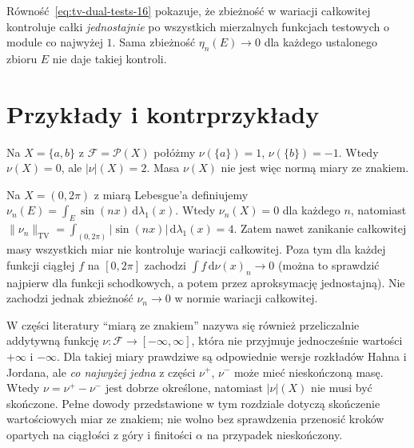 \begin{uwaga}
Równość~\eqref{eq:tv-dual-tests-16} pokazuje, że zbieżność
w wariacji całkowitej kontroluje całki \emph{jednostajnie}
po wszystkich mierzalnych funkcjach testowych o module
co najwyżej $1$. Sama zbieżność $\eta_n(E)\to0$ dla
każdego ustalonego zbioru $E$ nie daje takiej kontroli.
\end{uwaga}

\section{Przykłady i kontrprzykłady}
\begin{przyklad}
Na $X=\{a,b\}$ z $\mathcal F=\mathcal P(X)$ połóżmy
$\nu(\{a\})=1$, $\nu(\{b\})=-1$. Wtedy
$\nu(X)=0$, ale $|\nu|(X)=2$.
Masa $\nu(X)$ nie jest więc normą miary ze znakiem.
\end{przyklad}

\begin{przyklad}
Na $X=(0,2\pi)$ z miarą Lebesgue'a definiujemy
$\nu_n(E)=\int_E\sin(nx)\,\mathrm d\lambda_1(x)$.
Wtedy $\nu_n(X)=0$ dla każdego $n$, natomiast
$\|\nu_n\|_{\mathrm{TV}}=
\int_{(0,2\pi)}|\sin(nx)|\,\mathrm d\lambda_1(x)=4$.
Zatem nawet zanikanie całkowitej masy wszystkich miar
nie kontroluje wariacji całkowitej. Poza tym dla każdej
funkcji ciągłej $f$ na $[0,2\pi]$ zachodzi
$\int f\,\mathrm d\nu(x)_n\to0$ (można to sprawdzić
najpierw dla funkcji schodkowych, a potem przez
aproksymację jednostajną). Nie zachodzi jednak
zbieżność $\nu_n\to0$ w normie wariacji całkowitej.
\end{przyklad}

\begin{uwaga}
W części literatury ``miarą ze znakiem'' nazywa się
również przeliczalnie addytywną funkcję
$\nu:\mathcal F\to[-\infty,\infty]$, która nie przyjmuje
jednocześnie wartości $+\infty$ i $-\infty$.
Dla takiej miary prawdziwe są odpowiednie wersje
rozkładów Hahna i Jordana, ale \emph{co najwyżej jedna}
z części $\nu^+$, $\nu^-$ może mieć nieskończoną masę.
Wtedy $\nu=\nu^+-\nu^-$ jest dobrze określone,
natomiast $|\nu|(X)$ nie musi być skończone.
Pełne dowody przedstawione w tym rozdziale dotyczą
skończenie wartościowych miar ze znakiem; nie wolno
bez sprawdzenia przenosić kroków opartych na
ciągłości z góry i finitości $\alpha$ na przypadek
nieskończony.
\end{uwaga}
